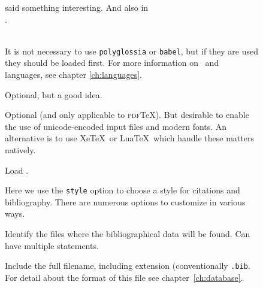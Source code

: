 \begin{figure}
\begin{minipage}[t]{0.7\linewidth}
  said something interesting. And also in\\
  \colorbox{blue!15}{}.\\
  \vspace{2pc}
  \colorbox{blue!15}{}\\
  \vspace{1pc}
\end{minipage}%
\begin{minipage}[t]{0.7\linewidth}
  \sffamily\small
  \vspace{1pc}
   It is not necessary to use \texttt{polyglossia} or \texttt{babel},
  but if they are used they should be loaded first. For more
  information on \biblatex\ and languages, see chapter
  \ref{ch:languages}.
  \vspace{1pc}

   Optional,
  but a good idea.

  \vspace{1pc} 
  Optional (and only applicable to \textsc{pdf}\TeX). But
  desirable to enable the use of unicode-encoded input files and
  modern fonts. An alternative is to use Xe\TeX\ or Lua\TeX\, which
  handle these matters natively.

  \vspace{1pc}

   Load \biblatex.
  \vspace{1pc}

  Here we use the
  \texttt{style} option to choose a style for citations
  and
  bibliography. There are numerous options to customize in various ways.

  \vspace{1pc}
  \strut{}
  Identify the files where the bibliographical data will be found. Can
  have multiple  statements.

  \vspace{0.5pc}
   Include the
  full filename, including extension (conventionally
  \texttt{.bib}. For detail about the format of this file see chapter~\ref{ch:database}.


\end{minipage}
\end{figure}
